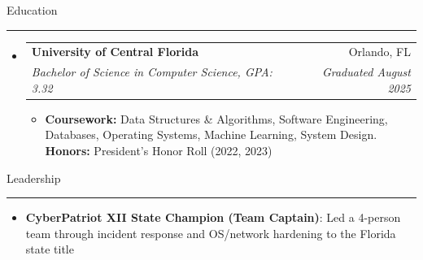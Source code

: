 \documentclass[a4paper,10pt]{article}
\makeatletter
\newcommand{\ressection}[1]{%
  \vspace{6pt}%
  {\large\scshape\raggedright #1}%
  \vspace{2pt}%
  \hrule%
  \vspace{3pt}%
}
\newcommand{\resumeItem}[2]{
  \item{\small\textbf{#1}{: #2}}
}
\newcommand{\resumeItemWithoutTitle}[1]{
  \item{\small{#1}}
}
\newcommand{\resumeSubheading}[4]{
  \vspace{-1pt}\item
    \begin{tabular*}{0.96\textwidth}[t]{l@{\extracolsep{\fill}}r}
      \textbf{#1} & #2 \\
      \textit{\small#3} & \textit{\small #4} \\
    \end{tabular*}\vspace{-2pt}
}
\newcommand{\resumeSubItem}[2]{\resumeItem{#1}{#2}}
\newenvironment{resumeSubHeadingList}{\begin{itemize}\setlength{\itemsep}{2pt}\setlength{\parskip}{0pt}\setlength{\leftmargin}{0em}\setlength{\labelsep}{0pt}\renewcommand{\labelitemi}{}}{\end{itemize}}
\newenvironment{resumeItemList}{\begin{itemize}\setlength{\itemsep}{1pt}\setlength{\parsep}{0pt}\setlength{\leftmargin}{1em}}{\end{itemize}\vspace{-2pt}}
\makeatother
\begin{document}
\ressection{Education}
\begin{resumeSubHeadingList}
	\resumeSubheading{University of Central Florida}{Orlando, FL}
		{Bachelor of Science in Computer Science, GPA: 3.32}{Graduated August 2025}
	\begin{resumeItemList}
		\resumeItemWithoutTitle{\textbf{Coursework:} Data Structures \& Algorithms, Software Engineering, Databases, Operating Systems, Machine Learning, System Design. \textbf{Honors:} President's Honor Roll (2022, 2023)}
	\end{resumeItemList}
\end{resumeSubHeadingList}

\ressection{Leadership}
\begin{resumeSubHeadingList}
	\resumeSubItem{CyberPatriot XII State Champion (Team Captain)}{Led a 4-person team through incident response and OS/network hardening to the Florida state title}
\end{resumeSubHeadingList}
\end{document}
